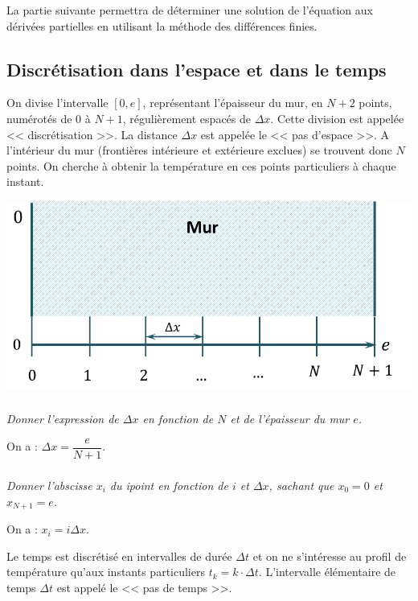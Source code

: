 \documentclass[10pt,fleqn]{article} %
\begin{document}
\begin{multicols}{2}
La partie suivante permettra de déterminer une solution de l'équation aux dérivées partielles en utilisant la méthode des différences finies.

\fi
\subsection*{Discrétisation dans l'espace et dans le temps}
\ifprof
\else


On divise l'intervalle $[0,e]$, représentant l'épaisseur du mur, en $N+2$ points, numérotés de 0 à $N+1$, régulièrement espacés de $\Delta x$. Cette division est appelée << discrétisation >>. La distance $\Delta x$ est appelée le << pas d’espace >>. A l'intérieur du mur (frontières intérieure et extérieure exclues) se trouvent donc $N$ points. On cherche à obtenir la température en ces points particuliers à chaque instant. 



\begin{center}
\includegraphics[width=\linewidth]{images/figure_02}
\end{center}

\fi

\subparagraph{\label{q_xini}}\textit{Donner l'expression de $\Delta x$ en fonction de $N$ et de l'épaisseur du mur $e$.}
\ifprof
\begin{corrige}
On a : $\Delta x = \dfrac{e}{N+1}$.
\end{corrige}
\else
\fi


\subparagraph{\label{q_xini2}}\textit{Donner l'abscisse $x_i$ du i\ieme point 
en fonction de $i$ et $\Delta x$, sachant que $x_0=0$ et  $x_{N+1} = e$.}
\ifprof
\begin{corrige}
On a : $x_i = i \Delta x$.
\end{corrige}
\else
\fi
\ifprof
\else
\vspace{.5cm}

Le temps est discrétisé en \textit{} intervalles de durée $\Delta t$ et on ne s'intéresse 
au profil de température qu'aux instants particuliers $t_k = k \cdot \Delta t$. 
L'intervalle élémentaire de temps $\Delta t$ est appelé le << pas de temps >>.


\end{multicols}
\end{document}
